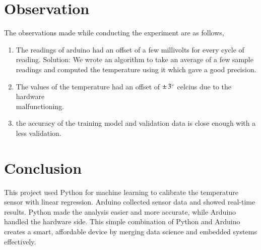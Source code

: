 \documentclass[journal,12pt,twocolumn]{IEEEtran}
\begin{document}
\section{Observation}
The observations made while conducting the experiment are as follows,
\begin{enumerate}
    \item The readings of arduino had an offset of a few millivolts for every cycle of reading.
    Solution: We wrote an algorithm to take an average of a few sample readings and computed the temperature using it which gave a good precision.
    \item The values of the temperature had an offset of $\pm \,3\degree$ celcius due to the hardware \\malfunctioning.
    \item the accuracy of the training model and validation data is close enough with a less validation.
\end{enumerate}

\section{Conclusion}

This project used Python for machine learning to calibrate the temperature sensor with linear regression. Arduino collected sensor data and showed real-time results. Python made the analysis easier and more accurate, while Arduino handled the hardware side. This simple combination of Python and Arduino creates a smart, affordable device by merging data science and embedded systems effectively.
\end{document}
